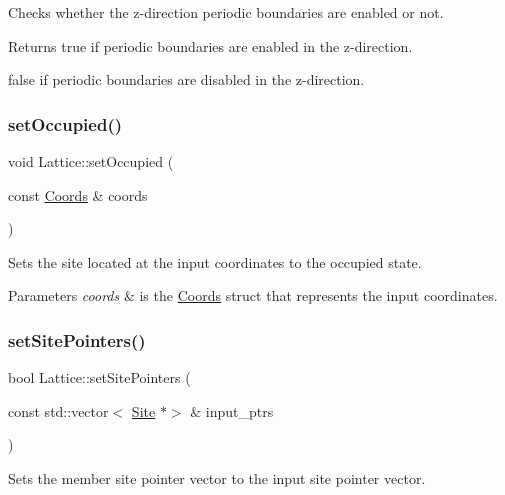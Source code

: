 Checks whether the z-\/direction periodic boundaries are enabled or not. 

\begin{DoxyReturn}{Returns}
true if periodic boundaries are enabled in the z-\/direction. 

false if periodic boundaries are disabled in the z-\/direction. 
\end{DoxyReturn}
\mbox{\label{class_lattice_a515b8bc548ef4a87c3495a7352a60399}} 
\subsubsection{\texorpdfstring{set\+Occupied()}{setOccupied()}}
{\footnotesize\ttfamily void Lattice\+::set\+Occupied (\begin{DoxyParamCaption}\item[{const \hyperlink{struct_coords}{Coords} \&}]{coords }\end{DoxyParamCaption})}



Sets the site located at the input coordinates to the occupied state. 


\begin{DoxyParams}{Parameters}
{\em coords} & is the \hyperlink{struct_coords}{Coords} struct that represents the input coordinates. \\
\hline
\end{DoxyParams}
\mbox{\label{class_lattice_a59546ec4301871897ba5adfda1126741}} 
\subsubsection{\texorpdfstring{set\+Site\+Pointers()}{setSitePointers()}}
{\footnotesize\ttfamily bool Lattice\+::set\+Site\+Pointers (\begin{DoxyParamCaption}\item[{const std\+::vector$<$ \hyperlink{class_site}{Site} $\ast$$>$ \&}]{input\+\_\+ptrs }\end{DoxyParamCaption})}



Sets the member site pointer vector to the input site pointer vector. 


